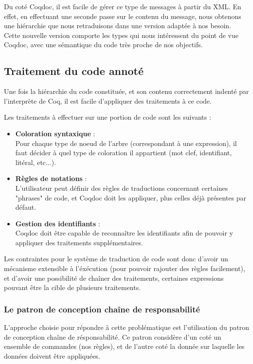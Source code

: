 \documentclass[a4paper, 11pt]{report}
\begin{document}
    Du coté Coqdoc, il est facile de gérer ce type de messages à partir du XML.
    En effet, en effectuant une seconde passe sur le contenu du message, nous
    obtenons une hiérarchie que nous retraduisons dans une version adaptée à
    nos besoin. Cette nouvelle version comporte les types qui nous intéressent
    du point de vue Coqdoc, avec une sémantique du code très proche de nos
    objectifs.

    \subsection{Traitement du code annoté}
    Une fois la hiérarchie du code constituée, et son contenu correctement
    indenté par l'interprète de Coq, il est facile d'appliquer des traitements
    à ce code.

    Les traitements à effectuer sur une portion de code sont les suivants :
    \begin{itemize}
      \item \textbf{Coloration syntaxique} : \\
        Pour chaque type de noeud de l'arbre (correspondant à une expression),
        il faut décider à quel type de coloration il appartient (mot clef,
        identifiant, litéral, etc$\ldots$).
      \item \textbf{Règles de notations} : \\
        L'utilisateur peut définir des règles de traductions concernant
        certaines "phrases" de code, et Coqdoc doit les appliquer, plus celles
        déjà présentes par défaut.
      \item \textbf{Gestion des identifiants} : \\
        Coqdoc doit être capable de reconnaître les identifiants afin de pouvoir
        y appliquer des traitements supplémentaires.
    \end{itemize}

    Les contraintes pour le système de traduction de code sont donc d'avoir
    un mécanisme extensible à l'éxécution (pour pouvoir rajouter des règles
    facilement), et d'avoir une possibilité de chaîner des traitements, certaines
    expressions pouvant être la cible de plusieurs traitements.

    \subsubsection{Le patron de conception chaîne de responsabilité}
    L'approche choisie pour répondre à cette problématique est l'utilisation
    du patron de conception chaîne de résponsabilité. Ce patron considère d'un
    coté un ensemble de commandes (nos règles), et de l'autre coté la donnée sur
    laquelle les données doivent être appliquées.
\end{document}

